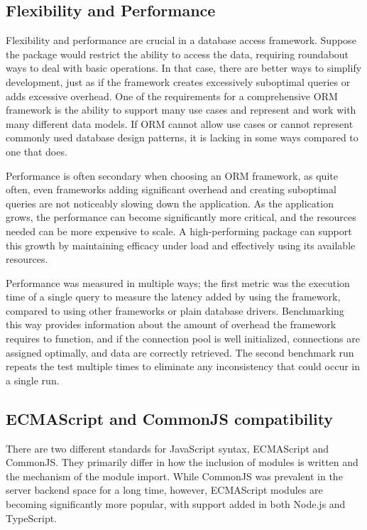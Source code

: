 \subsection{Flexibility and Performance}

Flexibility and performance are crucial in a database access framework. Suppose
the package would restrict the ability to access the data, requiring roundabout
ways to deal with basic operations. In that case, there are better ways to
simplify development, just as if the framework creates excessively suboptimal
queries or adds excessive overhead. One of the requirements for a comprehensive
ORM framework is the ability to support many use cases and represent and work
with many different data models. If ORM cannot allow use cases or cannot
represent commonly used database design patterns, it is lacking in some ways
compared to one that does.

Performance is often secondary when choosing an ORM framework, as quite often,
even frameworks adding significant overhead and creating suboptimal queries are
not noticeably slowing down the application. As the application grows, the
performance can become significantly more critical, and the resources needed can
be more expensive to scale. A high-performing package can support this growth by
maintaining efficacy under load and effectively using its available resources.

Performance was measured in multiple ways; the first metric was the execution
time of a single query to measure the latency added by using the framework,
compared to using other frameworks or plain database drivers. Benchmarking this
way provides information about the amount of overhead the framework requires to
function, and if the connection pool is well initialized, connections are
assigned optimally, and data are correctly retrieved. The second benchmark run
repeats the test multiple times to eliminate any inconsistency that could occur
in a single run.

\subsection{ECMAScript and CommonJS compatibility}
There are two different standards for JavaScript syntax, ECMAScript and
CommonJS. They primarily differ in how the inclusion of modules is
written and the mechanism of the module import. While CommonJS was prevalent in
the server backend space for a long time, however, ECMAScript modules are
becoming significantly more popular, with support added in both Node.js
and TypeScript.

